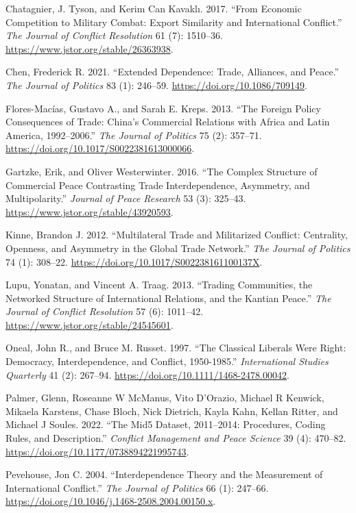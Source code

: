 \documentclass[
  letterpaper,
]{article}
\newlength{\cslhangindent}
\newlength{\cslentryspacingunit} %
\newenvironment{CSLReferences}[2] %
 {%
  \setlength{\parindent}{0pt}
  \ifodd #1
  \let\oldpar\par
  \def\par{\hangindent=\cslhangindent\oldpar}
  \fi
  \setlength{\parskip}{#2\cslentryspacingunit}
 }%
 {}
\begin{document}
\hypertarget{refs}{}
\begin{CSLReferences}{1}{0}
\leavevmode{}%
Chatagnier, J. Tyson, and Kerim Can Kavaklı. 2017. {``From {Economic
Competition} to {Military Combat}: {Export Similarity} and
{International Conflict}.''} \emph{The Journal of Conflict Resolution}
61 (7): 1510--36. \url{https://www.jstor.org/stable/26363938}.

\leavevmode{}%
Chen, Frederick R. 2021. {``Extended {Dependence}: {Trade}, {Alliances},
and {Peace}.''} \emph{The Journal of Politics} 83 (1): 246--59.
\url{https://doi.org/10.1086/709149}.

\leavevmode{}%
Flores-Macías, Gustavo A., and Sarah E. Kreps. 2013. {``The {Foreign
Policy Consequences} of {Trade}: {China}'s {Commercial Relations} with
{Africa} and {Latin America}, 1992--2006.''} \emph{The Journal of
Politics} 75 (2): 357--71.
\url{https://doi.org/10.1017/S0022381613000066}.

\leavevmode{}%
Gartzke, Erik, and Oliver Westerwinter. 2016. {``The Complex Structure
of Commercial Peace Contrasting Trade Interdependence, Asymmetry, and
Multipolarity.''} \emph{Journal of Peace Research} 53 (3): 325--43.
\url{https://www.jstor.org/stable/43920593}.

\leavevmode{}%
Kinne, Brandon J. 2012. {``Multilateral {Trade} and {Militarized
Conflict}: {Centrality}, {Openness}, and {Asymmetry} in the {Global
Trade Network}.''} \emph{The Journal of Politics} 74 (1): 308--22.
\url{https://doi.org/10.1017/S002238161100137X}.

\leavevmode{}%
Lupu, Yonatan, and Vincent A. Traag. 2013. {``Trading {Communities}, the
{Networked Structure} of {International Relations}, and the {Kantian
Peace}.''} \emph{The Journal of Conflict Resolution} 57 (6): 1011--42.
\url{https://www.jstor.org/stable/24545601}.

\leavevmode{}%
Oneal, John R., and Bruce M. Russet. 1997. {``The Classical Liberals
Were Right: Democracy, Interdependence, and Conflict, 1950-1985.''}
\emph{International Studies Quarterly} 41 (2): 267--94.
\url{https://doi.org/10.1111/1468-2478.00042}.

\leavevmode{}%
Palmer, Glenn, Roseanne W McManus, Vito D'Orazio, Michael R Kenwick,
Mikaela Karstens, Chase Bloch, Nick Dietrich, Kayla Kahn, Kellan Ritter,
and Michael J Soules. 2022. {``The {Mid5 Dataset}, 2011--2014:
{Procedures}, Coding Rules, and Description.''} \emph{Conflict
Management and Peace Science} 39 (4): 470--82.
\url{https://doi.org/10.1177/0738894221995743}.

\leavevmode{}%
Pevehouse, Jon C. 2004. {``Interdependence {Theory} and the
{Measurement} of {International Conflict}.''} \emph{The Journal of
Politics} 66 (1): 247--66.
\url{https://doi.org/10.1046/j.1468-2508.2004.00150.x}.

\end{CSLReferences}
\end{document}
